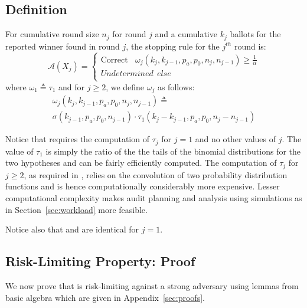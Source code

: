 \subsection{Definition}
\label{sec:prov_def}
\begin{definition}
    \label{def:minervatwo}
    For cumulative round size $n_j$ for round $j$ and a cumulative $k_j$ ballots for the reported winner found in round $j$, the \R \Providence stopping rule for the $j^{th}$ round is:
$$
\mathcal{A}(X_{j})=  \left\{ \begin{array}{ll} \text{Correct} ~~~~ \omega_{j}(k_{j}, k_{j-1}, p_a, p_0, n_j, n_{j-1}) \geq \frac{1}{\alpha}\\
        Undetermined ~~else \\
    \end{array}
    \right .
$$
where $\omega _{1}\triangleq \tau_{1}$ and for $j\ge 2$, we define $\omega _{j}$ as follows:
\begin{equation}
    \begin{aligned}
    \omega_{j}(k_{j}, k_{j-1}, p_a, p_0, n_{j}, n_{j-1})
    \triangleq\\
    \sigma(k_{j-1},p_a,p_0,n_{j-1})\cdot \tau_1(k_{j}-k_{j-1},p_a,p_0,n_j-n_{j-1})
    \end{aligned}
\end{equation}
\end{definition}

Notice that \Providence requires the computation of $\tau_j$ for $j=1$ and no other values of $j$. The value of $\tau_1$ is simply the ratio of the the tails of the binomial distributions for the two hypotheses and can be fairly efficiently computed. The computation of $\tau_j$ for $j \geq 2$, as required in \Minerva, relies on the convolution of two probability distribution functions and is hence computationally considerably more expensive. Lesser computational complexity makes audit planning and analysis using simulations as in Section~\ref{sec:workload} more feasible.

Notice also that \Providence and \Minerva are identical for $j=1$. 

\subsection{Risk-Limiting Property: Proof}
\label{sec:proof}
We now prove that \Providence is risk-limiting against a strong adversary using lemmas from basic algebra which are given in Appendix~\ref{sec:proofs}.

